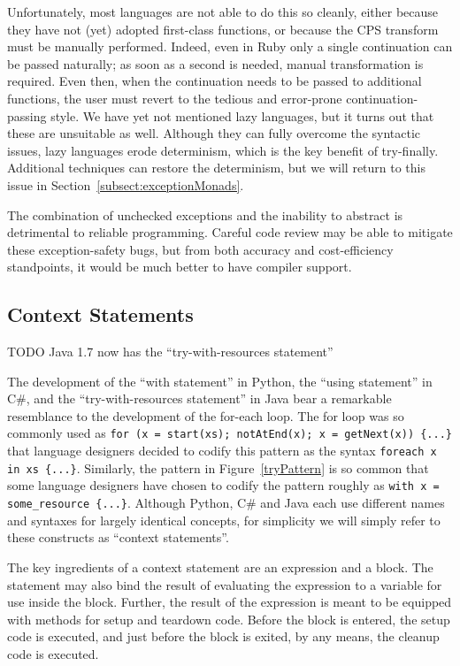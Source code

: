 \documentclass[11pt]{article}
\newcommand{\maybePage}{\newpage}
\begin{document}
Unfortunately, most languages are not able to do this so cleanly, either because they have not (yet) adopted first-class functions, or because the CPS transform must be manually performed.
Indeed, even in Ruby only a single continuation can be passed naturally; as soon as a second is needed, manual transformation is required.
Even then, when the continuation needs to be passed to additional functions, the user must revert to the tedious and error-prone continuation-passing style.
We have yet not mentioned lazy languages, but it turns out that these are unsuitable as well.
Although they can fully overcome the syntactic issues, lazy languages erode determinism, which is the key benefit of try-finally.
Additional techniques can restore the determinism, but we will return to this issue in Section~\ref{subsect:exceptionMonads}.

The combination of unchecked exceptions and the inability to abstract is detrimental to reliable programming.
Careful code review may be able to mitigate these exception-safety bugs, but from both accuracy and cost-efficiency standpoints, it would be much better to have compiler support.


\maybePage
\subsection{Context Statements}
\label{context statements}

TODO Java 1.7 now has the ``try-with-resources statement''

The development of the ``with statement'' in Python, the ``using statement'' in C\#, and the ``try-with-resources statement'' in Java bear a remarkable resemblance to the development of the for-each loop.
The for loop was so commonly used as \texttt{for (x = start(xs); notAtEnd(x); x = getNext(x)) \{...\}} that language designers decided to codify this pattern as the syntax \texttt{foreach x in xs \{...\}}.
Similarly, the pattern in Figure~\ref{tryPattern} is so common that some language designers have chosen to codify the pattern roughly as \texttt{with x = some\_resource \{...\}}.
Although Python, C\# and Java each use different names and syntaxes for largely identical concepts, for simplicity we will simply refer to these constructs as ``context statements''.

The key ingredients of a context statement are an expression and a block.
The statement may also bind the result of evaluating the expression to a variable for use inside the block.
Further, the result of the expression is meant to be equipped with methods for setup and teardown code.
Before the block is entered, the setup code is executed, and just before the block is exited, by any means, the cleanup code is executed.\cite{JavaStandard}\cite{PEP343}\cite{cSharpStandard}
\end{document}
